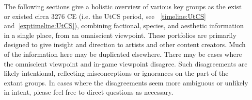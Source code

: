 The following sections give a holistic overview of various key groups
as the exist or existed circa 3276 CE (i.e. the UtCS period, see
~\ref{timeline:UtCS} and~\ref{exptimeline:UtCS}), combining factional, species, and aesthetic
information in a single place, from an omniscient viewpoint. These
portfolios are primarily designed to give insight and direction to
artists and other content creators. Much of the information here may
be duplicated elsewhere. There may be cases where the omniscient
viewpoint and in-game viewpoint disagree. Such disagreements are
likely intentional, reflecting misconceptions or ignorances on the
part of the extant groups. In cases where the disagreements seem more
ambiguous or unlikely in intent, please feel free to direct questions
as necessary.



%
